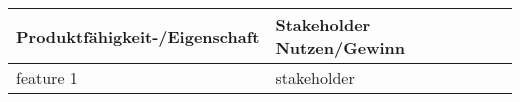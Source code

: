 \documentclass[../../Pflichtenheft.tex]{subfiles}
\begin{document}
    \begin{longtable}{|p{7cm}|p{7cm}|}
        \hline
        Produktfähigkeit-/Eigenschaft & Stakeholder Nutzen/Gewinn \\ \hline
        feature 1 & stakeholder
        \hline
    \end{longtable}
\end{document}
